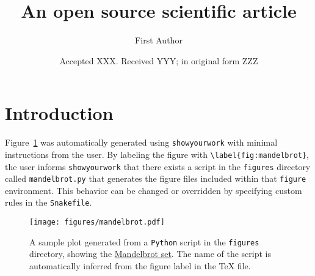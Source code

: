 \documentclass[fleqn,usenatbib]{mnras}
\date{Accepted XXX. Received YYY; in original form ZZZ}
\title{An open source scientific article}
\author{First Author}
\begin{document}
\pagerange{\pageref{firstpage}--\pageref{lastpage}}
\maketitle

\begin{abstract}
    \blindtext
\end{abstract}

\label{firstpage}
\section{Introduction}

Figure~\ref{fig:mandelbrot} was automatically generated using \texttt{showyourwork} with minimal instructions from the user.
By labeling the figure with \verb+\label{fig:mandelbrot}+, the user informs \texttt{showyourwork} that there exists a script in the \texttt{figures} directory called \texttt{mandelbrot.py} that generates the figure files included within that \texttt{figure} environment.
This behavior can be changed or overridden by specifying custom rules in the \texttt{Snakefile}.

\begin{figure}
    \begin{centering}
        \texttt{[image: figures/mandelbrot.pdf]}
        \caption{
            A sample plot generated from a \texttt{Python} script in the \texttt{figures} directory, showing the \href{https://en.wikipedia.org/wiki/Mandelbrot_set}{Mandelbrot set}.
            The name of the script is automatically inferred from the figure label in the TeX file.
        }
        \label{fig:mandelbrot}
    \end{centering}
\end{figure}

\bsp
\label{lastpage}
\end{document}

